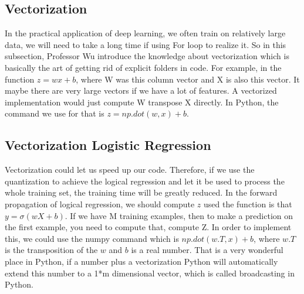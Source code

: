 \documentclass[a4paper]{article}
\begin{document}
\subsection{Vectorization}
\par
In the practical application of deep learning,  we often train on relatively large data, we will need to take a long time if using For loop to realize it. So in this subsection, Professor Wu introduce the knowledge about vectorization which is basically the art of getting rid of explicit folders in code. For example, in the function $z=wx+b$, where W was this column vector and X is also this vector. It maybe there are very large vectors if we have a lot of features. A vectorized implementation would just compute W transpose X directly. In Python, the command we use for that is $z=np.dot(w,x)+b$.  
\subsection{Vectorization Logistic Regression}
\par
Vectorization could let us speed up our code. Therefore, if we use the quantization to achieve the logical regression and let it be used to process the whole training set, the training time will be greatly reduced. In the forward propagation of logical regression, we should compute $z$ used the function is that $y= \sigma (wX+b)$. If we have M training examples, then to make a prediction on the first example, you need to compute that, compute Z. In order to implement this, we could use the numpy command which is $np.dot(w.T,x)+b$, where $w.T$ is the transposition of the $w$ and $b$ is a real number. That is a very wonderful place in Python, if a number plus a vectorization Python will automatically extend this number to a 1*m dimensional vector, which is called broadcasting in Python.
\end{document}
